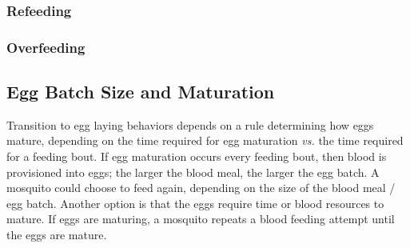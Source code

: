 \documentclass{article}
\begin{document}
\subsubsection{Refeeding}

\subsubsection{Overfeeding}

\subsection{Egg Batch Size and Maturation}

Transition to egg laying behaviors depends on a rule determining
how eggs mature, depending on the time required for egg
maturation {\em vs.} the time required for a feeding bout. If egg
maturation occurs every feeding bout, then blood is provisioned
into eggs; the larger the blood meal, the larger the egg batch. A
mosquito could choose to feed again, depending on the size of the
blood meal / egg batch. Another option is that the eggs require
time or blood resources to mature. If eggs are maturing, a
mosquito repeats a blood feeding attempt until the eggs are
mature.
\end{document}
